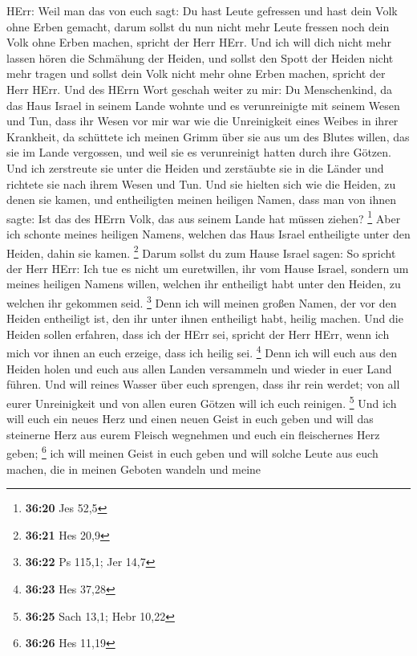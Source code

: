 HErr: Weil man das von euch sagt: Du hast Leute gefressen und hast dein
Volk ohne Erben gemacht,  darum sollst du nun nicht mehr
Leute fressen noch dein Volk ohne Erben machen, spricht der Herr HErr.
 Und ich will dich nicht mehr lassen hören die Schmähung
der Heiden, und sollst den Spott der Heiden nicht mehr tragen und sollst
dein Volk nicht mehr ohne Erben machen, spricht der Herr HErr.
 Und des HErrn Wort geschah weiter zu mir:  Du
Menschenkind, da das Haus Israel in seinem Lande wohnte und es
verunreinigte mit seinem Wesen und Tun, dass ihr Wesen vor mir war wie
die Unreinigkeit eines Weibes in ihrer Krankheit,  da
schüttete ich meinen Grimm über sie aus um des Blutes willen, das sie im
Lande vergossen, und weil sie es verunreinigt hatten durch ihre Götzen.
 Und ich zerstreute sie unter die Heiden und zerstäubte sie
in die Länder und richtete sie nach ihrem Wesen und Tun. 
Und sie hielten sich wie die Heiden, zu denen sie kamen, und
entheiligten meinen heiligen Namen, dass man von ihnen sagte: Ist das
des HErrn Volk, das aus seinem Lande hat müssen ziehen? \footnote{\textbf{36:20}
  Jes 52,5}  Aber ich schonte meines heiligen Namens,
welchen das Haus Israel entheiligte unter den Heiden, dahin sie kamen.
\footnote{\textbf{36:21} Hes 20,9}  Darum sollst du zum
Hause Israel sagen: So spricht der Herr HErr: Ich tue es nicht um
euretwillen, ihr vom Hause Israel, sondern um meines heiligen Namens
willen, welchen ihr entheiligt habt unter den Heiden, zu welchen ihr
gekommen seid. \footnote{\textbf{36:22} Ps 115,1; Jer 14,7}
 Denn ich will meinen großen Namen, der vor den Heiden
entheiligt ist, den ihr unter ihnen entheiligt habt, heilig machen. Und
die Heiden sollen erfahren, dass ich der HErr sei, spricht der Herr
HErr, wenn ich mich vor ihnen an euch erzeige, dass ich heilig sei.
\footnote{\textbf{36:23} Hes 37,28}  Denn ich will euch aus
den Heiden holen und euch aus allen Landen versammeln und wieder in euer
Land führen.  Und will reines Wasser über euch sprengen,
dass ihr rein werdet; von all eurer Unreinigkeit und von allen euren
Götzen will ich euch reinigen. \footnote{\textbf{36:25} Sach 13,1; Hebr
  10,22}  Und ich will euch ein neues Herz und einen neuen
Geist in euch geben und will das steinerne Herz aus eurem Fleisch
wegnehmen und euch ein fleischernes Herz geben; \footnote{\textbf{36:26}
  Hes 11,19}  ich will meinen Geist in euch geben und will
solche Leute aus euch machen, die in meinen Geboten wandeln und meine
